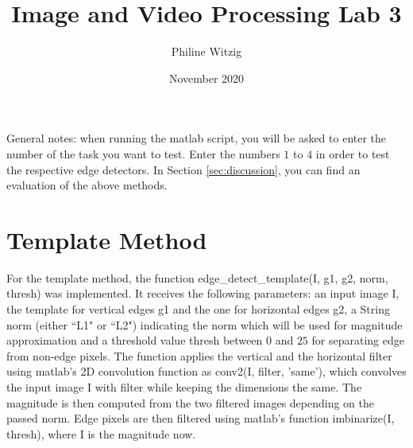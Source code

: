 \documentclass{article}
\title{Image and Video Processing Lab 3}
\author{Philine Witzig}
\date{November 2020}
\begin{document}
\maketitle
General notes: when running the matlab script, you will be asked to enter the number of the task you want to test. Enter the numbers $1$ to $4$ in order to test the respective edge detectors. In Section \ref{sec:discussion}, you can find an evaluation of the above methods.

\section{Template Method}
For the template method, the function \textsf{edge\_detect\_template(I, g1, g2, norm, thresh)} was implemented. It receives the following parameters: an input image \textsf{I}, the template for vertical edges \textsf{g1} and the one for horizontal edges \textsf{g2}, a String \textsf{norm} (either ``L1" or ``L2") indicating the norm which will be used for magnitude approximation and a threshold value \textsf{thresh} between $0$ and $25$ for separating edge from non-edge pixels. The function applies the vertical and the horizontal filter using matlab's 2D convolution function as \textsf{conv2(I, filter, 'same')}, which convolves the input image \textsf{I} with \textsf{filter} while keeping the dimensions the same. The magnitude is then computed from the two filtered images depending on the passed norm. Edge pixels are then filtered using matlab's function \textsf{imbinarize(I, thresh)}, where \textsf{I} is the magnitude now.
\end{document}
